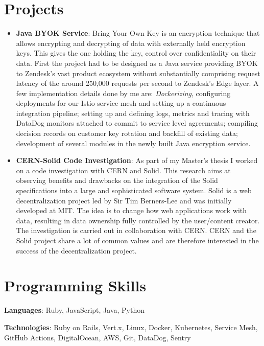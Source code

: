 \documentclass[letterpaper,11pt]{article}
\newcommand{\resumeItem}[2]{
  \item\small{
    \textbf{#1}{: #2 \vspace{-2pt}}
  }
}
\newcommand{\resumeSubItem}[2]{\resumeItem{#1}{#2}\vspace{-4pt}}
\newcommand{\resumeSubHeadingListStart}{\begin{itemize}[leftmargin=*]}
\newcommand{\resumeSubHeadingListEnd}{\end{itemize}}
\begin{document}
\section{Projects}
  \resumeSubHeadingListStart
    \resumeSubItem{Java BYOK Service}{Bring Your Own Key is an encryption technique that allows encrypting and decrypting of data with externally held encryption keys. This gives the one holding the key, control over confidentiality on their data. First the project had to be designed as a Java service providing BYOK to Zendesk's vast product ecosystem without substantially comprising request latency of the around 250,000 requests per second to Zendesk's Edge layer. A few implementation details done by me are: \textit{Dockerizing}, configuring deployments for our Istio service mesh and setting up a continuous integration pipeline; setting up and defining logs, metrics and tracing with DataDog monitors attached to commit to service level agreements; compiling decision records on customer key rotation and backfill of existing data; development of several modules in the newly built Java encryption service.}
    \resumeSubItem{CERN-Solid Code Investigation}
      {As part of my Master's thesis I worked on a code investigation with CERN and Solid. This research aims at observing beneﬁts and drawbacks on the integration of the Solid speciﬁcations into a large and sophisticated software system. Solid is a web decentralization project led by Sir Tim Berners-Lee and was initially developed at MIT. The idea is to change how web applications work with data, resulting in data ownership fully controlled by the user/content creator. The investigation is carried out in collaboration with CERN. CERN and the Solid project share a lot of common values and are therefore interested in the success of the decentralization project.}
  \resumeSubHeadingListEnd

\section{Programming Skills}
 \resumeSubHeadingListStart
   \item{
     \textbf{Languages}{: Ruby, JavaScript, Java, Python }
     \hfill
   \item
     \textbf{Technologies}{: Ruby on Rails, Vert.x, Linux, Docker, Kubernetes, Service Mesh, GitHub Actions, DigitalOcean, AWS, Git, DataDog, Sentry }
   }
 \resumeSubHeadingListEnd

\end{document}
